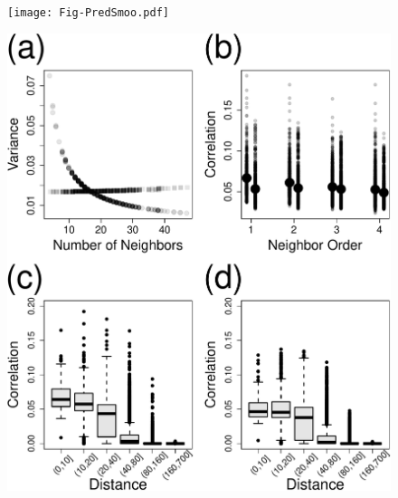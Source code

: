 \documentclass[11pt, titlepage]{article}\usepackage[]{graphicx}\usepackage[]{color}
\begin{document}
\begin{spacing}{1.9}
\begin{flushleft}


\begin{figure}[H]
  \begin{center}
  \texttt{[image: Fig-PredSmoo.pdf]}
  \end{center}
  \caption{ \label{Fig-PredSmoo}}     
\end{figure}




\begin{figure}[H]
  \begin{center}
  \includegraphics[width=\linewidth]{Fig-MargVar.pdf}
  \end{center}
  \caption{ \label{Fig-MargVar}}     
\end{figure}






\end{flushleft}
\end{spacing}
\end{document}

